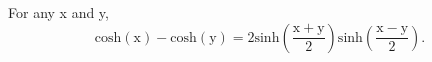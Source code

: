For any x and y,
\[ \mathrm{cosh(x)-cosh(y)} =
2 \mathrm{sinh} \left ( \frac{\mathrm{x+y}}{2} \right ) 
\mathrm{sinh} \left ( \frac{\mathrm{x-y}}{2} \right ) . \]
